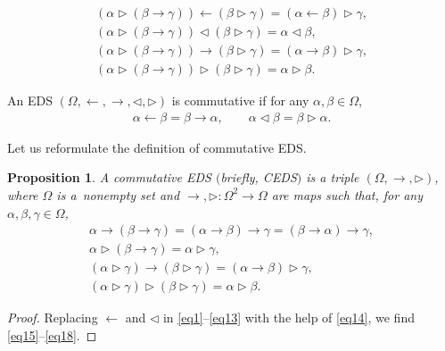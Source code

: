 \documentclass[10pt,a4paper]{amsart}
\numberwithin{equation}{section}
\newtheorem{Proposition}[Theorem]{Proposition}
 { \theoremstyle{definition}
\newtheorem{Definition}[Theorem]{Definition}
\newtheorem{Note}[Theorem]{Note}
\newtheorem{Example}[Theorem]{Example}
\newtheorem{Remark}[Theorem]{Remark}
\newtheorem{Notation}[Theorem]{Notation}}
\begin{document}
\begin{Definition}
\begin{enumerate}
\begin{enumerate}
\begin{gather}
(\alpha \triangleright (\beta \rightarrow \gamma))\leftarrow (\beta \triangleright \gamma)=(\alpha \leftarrow \beta) \triangleright \gamma,\\
(\alpha \triangleright (\beta \rightarrow \gamma))\triangleleft (\beta \triangleright \gamma)=\alpha \triangleleft \beta,\\
\label{eq12} (\alpha \triangleright (\beta \rightarrow \gamma))\rightarrow (\beta \triangleright \gamma)=(\alpha \rightarrow \beta)\triangleright \gamma,\\
\label{eq13} (\alpha \triangleright (\beta \rightarrow \gamma))\triangleright (\beta \triangleright \gamma)=\alpha \triangleright \beta.
\end{gather}
\end{enumerate}
\end{enumerate}
\end{Definition}

An EDS $(\Omega,\leftarrow,\rightarrow,\triangleleft,\triangleright)$ is commutative if for any $\alpha,\beta \in \Omega$,
\begin{align}
\label{eq14}\alpha \leftarrow \beta=\beta \rightarrow \alpha,\qquad\alpha \triangleleft \beta=\beta \triangleright \alpha.
\end{align}

Let us reformulate the definition of commutative EDS.

\begin{Proposition}
A commutative EDS $($briefly, CEDS$)$ is a triple $(\Omega,\rightarrow,\triangleright)$, where $\Omega$ is a~non\-empty set and $\rightarrow, \triangleright\colon\Omega^2\longrightarrow \Omega$ are maps such that, for any $\alpha,\beta,\gamma \in \Omega$,
\begin{gather}
\label{eq15} \alpha \rightarrow (\beta \rightarrow \gamma)=(\alpha \rightarrow \beta) \rightarrow \gamma=(\beta \rightarrow \alpha) \rightarrow \gamma,\\
\label{eq16} \alpha \triangleright (\beta \rightarrow \gamma)=\alpha \triangleright \gamma,\\
\label{eq17} (\alpha \triangleright \gamma)\rightarrow (\beta \triangleright \gamma)=(\alpha \rightarrow \beta)\triangleright \gamma,\\
\label{eq18} (\alpha \triangleright \gamma)\triangleright (\beta \triangleright \gamma)=\alpha \triangleright \beta.
\end{gather}\end{Proposition}

\begin{proof}
Replacing $\leftarrow$ and $\triangleleft$ in \eqref{eq1}--\eqref{eq13} with the help of \eqref{eq14}, we find \eqref{eq15}--\eqref{eq18}.
\end{proof}
\end{document}
